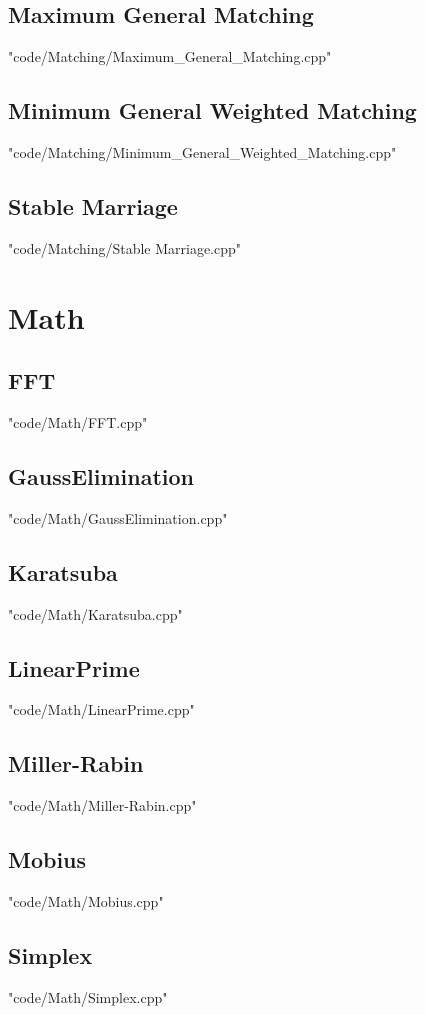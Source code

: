 \subsection{Maximum General Matching}
 {"code/Matching/Maximum_General_Matching.cpp"}
\subsection{Minimum General Weighted Matching}
 {"code/Matching/Minimum_General_Weighted_Matching.cpp"}
\subsection{Stable Marriage}
 {"code/Matching/Stable Marriage.cpp"}
\section{Math}
\subsection{FFT}
 {"code/Math/FFT.cpp"}
\subsection{GaussElimination}
 {"code/Math/GaussElimination.cpp"}
\subsection{Karatsuba}
 {"code/Math/Karatsuba.cpp"}
\subsection{LinearPrime}
 {"code/Math/LinearPrime.cpp"}
\subsection{Miller-Rabin}
 {"code/Math/Miller-Rabin.cpp"}
\subsection{Mobius}
 {"code/Math/Mobius.cpp"}
\subsection{Simplex}
 {"code/Math/Simplex.cpp"}
